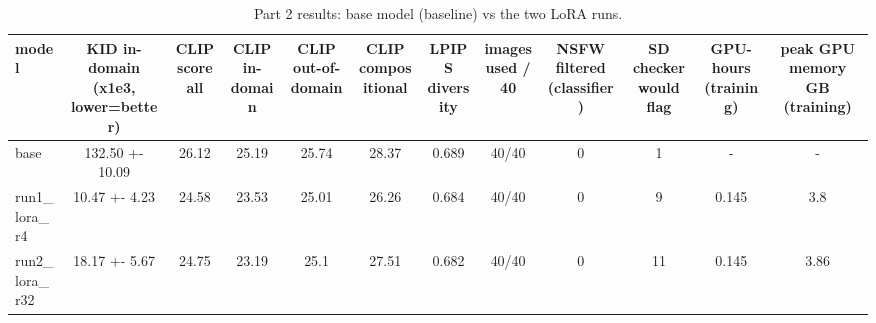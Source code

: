 \begin{table}[t]
\centering
\footnotesize
\caption{Part 2 results: base model (baseline) vs the two LoRA runs.}
\label{tab:p2}
\begin{tabular}{lccccccccccc}
\hline
\textbf{model} & \textbf{KID in-domain (x1e3, lower=better)} & \textbf{CLIP score all} & \textbf{CLIP in-domain} & \textbf{CLIP out-of-domain} & \textbf{CLIP compositional} & \textbf{LPIPS diversity} & \textbf{images used / 40} & \textbf{NSFW filtered (classifier)} & \textbf{SD checker would flag} & \textbf{GPU-hours (training)} & \textbf{peak GPU memory GB (training)} \\
\hline
base & 132.50 +- 10.09 & 26.12 & 25.19 & 25.74 & 28.37 & 0.689 & 40/40 & 0 & 1 & - & - \\
run1\_lora\_r4 & 10.47 +- 4.23 & 24.58 & 23.53 & 25.01 & 26.26 & 0.684 & 40/40 & 0 & 9 & 0.145 & 3.8 \\
run2\_lora\_r32 & 18.17 +- 5.67 & 24.75 & 23.19 & 25.1 & 27.51 & 0.682 & 40/40 & 0 & 11 & 0.145 & 3.86 \\
\hline
\end{tabular}
\end{table}